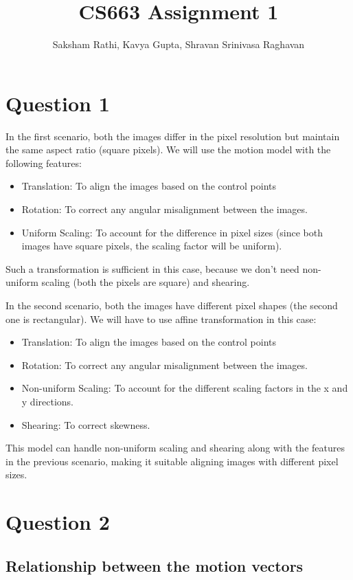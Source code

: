 \documentclass[12pt]{article}
\title{CS663 Assignment 1}
\author{Saksham Rathi, Kavya Gupta, Shravan Srinivasa Raghavan}
\begin{document}
\maketitle
\clearpage
\tableofcontents
\clearpage
\section{Question 1}

In the first scenario, both the images differ in the pixel resolution but maintain the same aspect ratio (square pixels). We will use the motion model with the following features:
\begin{itemize}
    \item Translation: To align the images based on the control points
    \item Rotation: To correct any angular misalignment between the images.
    \item Uniform Scaling: To account for the difference in pixel sizes (since both images have square pixels, the scaling factor will be uniform).
\end{itemize}
Such a transformation is sufficient in this case, because we don't need non-uniform scaling (both the pixels are square) and shearing.


In the second scenario, both the images have different pixel shapes (the second one is rectangular). We will have to use affine transformation in this case:
\begin{itemize}
    \item Translation: To align the images based on the control points
    \item Rotation: To correct any angular misalignment between the images.
    \item Non-uniform Scaling: To account for the different scaling factors in the x and y directions.
    \item Shearing: To correct skewness.
\end{itemize}
This model can handle non-uniform scaling and shearing along with the features in the previous scenario, making it suitable aligning images with different pixel sizes.
\section{Question 2}

    \vspace{-10pt}

    \subsection*{Relationship between the motion vectors}
\end{document}
